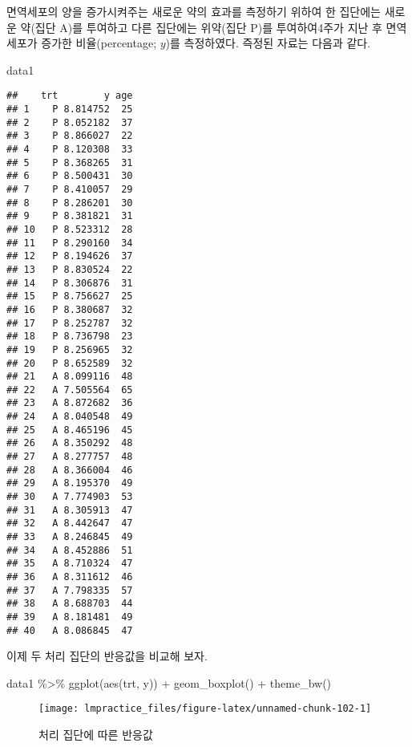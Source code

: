 \documentclass[
]{book}
\newenvironment{Shaded}{\begin{snugshade}}{\end{snugshade}}
\newcommand{\FunctionTok}[1]{\textcolor[rgb]{0.00,0.00,0.00}{#1}}
\newcommand{\NormalTok}[1]{#1}
\newcommand{\SpecialCharTok}[1]{\textcolor[rgb]{0.00,0.00,0.00}{#1}}
\begin{document}
면역세포의 양을 증가시켜주는 새로운 약의 효과를 측정하기 위하여 한 집단에는 새로운 약(집단 A)를 투여하고 다른 집단에는 위약(집단 P)를 투여하여4주가 지난 후 면역세포가 증가한 비율(percentage; \(y\))를 측정하였다. 즉정된 자료는 다음과 같다.

\begin{Shaded}
\begin{Highlighting}[]
\NormalTok{data1}
\end{Highlighting}
\end{Shaded}

\begin{verbatim}
##    trt        y age
## 1    P 8.814752  25
## 2    P 8.052182  37
## 3    P 8.866027  22
## 4    P 8.120308  33
## 5    P 8.368265  31
## 6    P 8.500431  30
## 7    P 8.410057  29
## 8    P 8.286201  30
## 9    P 8.381821  31
## 10   P 8.523312  28
## 11   P 8.290160  34
## 12   P 8.194626  37
## 13   P 8.830524  22
## 14   P 8.306876  31
## 15   P 8.756627  25
## 16   P 8.380687  32
## 17   P 8.252787  32
## 18   P 8.736798  23
## 19   P 8.256965  32
## 20   P 8.652589  32
## 21   A 8.099116  48
## 22   A 7.505564  65
## 23   A 8.872682  36
## 24   A 8.040548  49
## 25   A 8.465196  45
## 26   A 8.350292  48
## 27   A 8.277757  48
## 28   A 8.366004  46
## 29   A 8.195370  49
## 30   A 7.774903  53
## 31   A 8.305913  47
## 32   A 8.442647  47
## 33   A 8.246845  49
## 34   A 8.452886  51
## 35   A 8.710324  47
## 36   A 8.311612  46
## 37   A 7.798335  57
## 38   A 8.688703  44
## 39   A 8.181481  49
## 40   A 8.086845  47
\end{verbatim}

이제 두 처리 집단의 반응값을 비교해 보자.

\begin{Shaded}
\begin{Highlighting}[]
\NormalTok{data1 }\SpecialCharTok{\%\textgreater{}\%} \FunctionTok{ggplot}\NormalTok{(}\FunctionTok{aes}\NormalTok{(trt, y)) }\SpecialCharTok{+} \FunctionTok{geom\_boxplot}\NormalTok{()  }\SpecialCharTok{+} \FunctionTok{theme\_bw}\NormalTok{()}
\end{Highlighting}
\end{Shaded}

\begin{figure}

{\centering \texttt{[image: lmpractice\_files/figure-latex/unnamed-chunk-102-1]} 

}

\caption{처리 집단에 따른 반응값}\label{fig:unnamed-chunk-102}
\end{figure}
\end{document}
